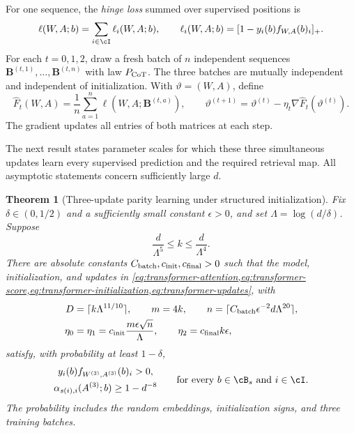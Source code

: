 \documentclass[11pt,twoside]{article}
\newtheorem{theorem}{Theorem}[section]
\theoremstyle{definition}
\theoremstyle{remark}
\begin{document}
For one sequence, the \emph{hinge loss} summed over supervised positions is
\[
\ell(W,A;b)=\sum_{i\in\cI}\ell_i(W,A;b),
\qquad
\ell_i(W,A;b)=[1-y_i(b)f_{W,A}(b)_i]_+.
\]
For each $t=0,1,2$, draw a fresh batch of $n$ independent sequences
$\mathbf B^{(t,1)},\ldots,\mathbf B^{(t,n)}$ with law $P_{\rm CoT}$.
The three batches are mutually independent and independent of initialization.
With $\vartheta=(W,A)$, define
\begin{equation}
\widehat F_t(W,A)=\frac1n\sum_{a=1}^n\ell(W,A;\mathbf B^{(t,a)}),
\qquad
\vartheta^{(t+1)}
=\vartheta^{(t)}-\eta_t\nabla\widehat F_t(\vartheta^{(t)}).
\label{eq:transformer-updates}
\end{equation}
The gradient updates all entries of both matrices at each step.

The next result states parameter scales for which these three simultaneous
updates learn every supervised prediction and the required retrieval map.
All asymptotic statements concern sufficiently large $d$.

\begin{theorem}[Three-update parity learning under structured initialization]
\label{thm:three-update}
Fix $\delta\in(0,1/2)$ and a sufficiently small constant $\epsilon>0$, and set
$\Lambda=\log(d/\delta)$. Suppose
\[
\frac{d}{\Lambda^5}\le k\le\frac{d}{\Lambda^4}.
\]
There are absolute constants $C_{\rm batch},c_{\rm init},c_{\rm final}>0$
such that the model, initialization, and updates in
\cref{eq:transformer-attention,eq:transformer-score,eq:transformer-initialization,eq:transformer-updates},
with
\begin{align*}
D&=\lceil k\Lambda^{11/10}\rceil,\qquad m=4k,\qquad
n=\lceil C_{\rm batch}\epsilon^{-2}d\Lambda^{20}\rceil,\\
\eta_0&=\eta_1=c_{\rm init}\frac{m\epsilon\sqrt n}{\Lambda},
\qquad \eta_2=c_{\rm final}k\epsilon,
\end{align*}
satisfy, with probability at least $1-\delta$,
\begin{equation}
\begin{gathered}
y_i(b)f_{W^{(3)},A^{(3)}}(b)_i>0,\\
\alpha_{s(i),i}(A^{(3)};b)\ge1-d^{-8}
\end{gathered}
\qquad
\text{for every }b\in\cB_s\text{ and }i\in\cI.
\label{eq:transformer-conclusions}
\end{equation}
The probability includes the random embeddings, initialization signs, and
three training batches.
\end{theorem}
\end{document}
